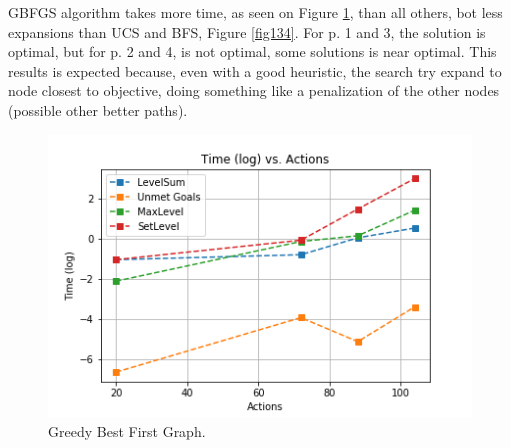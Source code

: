\documentclass[a4paper]{article}
\begin{document}


        
GBFGS algorithm takes more time, as seen on Figure \ref{fig131}, than all others, bot less expansions than UCS and BFS, Figure \ref{fig134}. For p. 1 and 3, the solution is optimal, but for p. 2 and 4, is not optimal, some solutions is near optimal. This results is expected because, even with a good heuristic, the search try expand to node closest to objective, doing something like a penalization of the other nodes (possible other better paths). 

\begin{figure}[htpb]
\begin{center}
\includegraphics[width=1\columnwidth]{fig/results_131.png}
\end{center}
\caption{Greedy Best First Graph.}
\label{fig131}
\end{figure}
\end{document}

